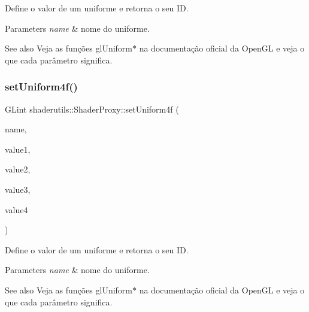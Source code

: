 Define o valor de um uniforme e retorna o seu ID. 
\begin{DoxyParams}{Parameters}
{\em name} & nome do uniforme. \\
\hline
\end{DoxyParams}
\begin{DoxySeeAlso}{See also}
Veja as funções gl\+Uniform$\ast$ na documentação oficial da Open\+GL e veja o que cada parâmetro significa. 
\end{DoxySeeAlso}
\mbox{\label{classshaderutils_1_1_shader_proxy_a49706cc164facf720ea671819a432d2f}} 
\subsubsection{\texorpdfstring{set\+Uniform4f()}{setUniform4f()}}
{\footnotesize\ttfamily G\+Lint shaderutils\+::\+Shader\+Proxy\+::set\+Uniform4f (\begin{DoxyParamCaption}\item[{const char $\ast$}]{name,  }\item[{G\+Lfloat}]{value1,  }\item[{G\+Lfloat}]{value2,  }\item[{G\+Lfloat}]{value3,  }\item[{G\+Lfloat}]{value4 }\end{DoxyParamCaption})\hspace{0.3cm}{\ttfamily [inline]}}

Define o valor de um uniforme e retorna o seu ID. 
\begin{DoxyParams}{Parameters}
{\em name} & nome do uniforme. \\
\hline
\end{DoxyParams}
\begin{DoxySeeAlso}{See also}
Veja as funções gl\+Uniform$\ast$ na documentação oficial da Open\+GL e veja o que cada parâmetro significa. 
\end{DoxySeeAlso}
\mbox{\label{classshaderutils_1_1_shader_proxy_af9675dc73014739ef88e0f384e68abfb}} 
